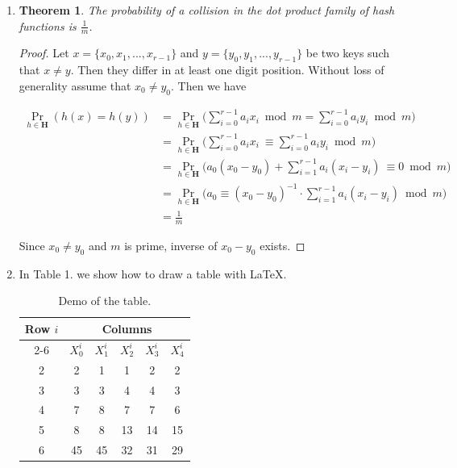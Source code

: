 \documentclass{article}
\newtheorem{theorem}{Theorem}
\begin{document}
\begin{enumerate}
\item
\begin{theorem}
    The probability of a collision in the dot product family of hash functions is $\frac{1}{m}$.
\end{theorem}

\begin{proof}
    Let $x = \{x_{0},x_{1},...,x_{r-1}\}$ and $y = \{y_{0},y_{1},...,y_{r-1}\}$ be two keys such that $x \not = y$. Then they differ in at least one digit position. Without loss of generality assume that $x_0 \not = y_0$. Then we have

    \begin{align*}
        \underset{h\in\mathbf{H}}{\Pr}(h(x)=h(y)) &= \underset{h\in\mathbf{H}}{\Pr}\bigl(\sum\limits_{i=0}^{r-1} a_{i}x_{i}\bmod  m=\sum\limits_{i=0}^{r-1} a_{i}y_{i} \bmod m\bigr)\\
        &= \underset{h\in\mathbf{H}}{\Pr}\bigl(\sum\limits_{i=0}^{r-1} a_{i}x_{i}\ \equiv \sum\limits_{i=0}^{r-1} a_{i}y_{i} \bmod m\bigr)\\
        &= \underset{h\in\mathbf{H}}{\Pr}\bigl(a_0(x_0-y_0) + \sum\limits_{i=1}^{r-1} a_{i}(x_{i}-y_i)\ \equiv 0 \bmod m\bigr)\\
        &= \underset{h\in\mathbf{H}}{\Pr}\bigl(a_0 \equiv (x_0-y_0)^{-1} \cdot \sum\limits_{i=1}^{r-1} a_{i}(x_{i}-y_i)\bmod{m}\bigr)\\
        &= \frac{1}{m}
    \end{align*}

    Since $x_0 \not = y_0$ and $m$ is prime, inverse of $x_0-y_0$ exists.
\end{proof}

\item

In Table 1. we show how to draw a table with \LaTeX.

\begin{table}[h]
\centering
\renewcommand{\arraystretch}{1.2}
\begin{tabular}{c|ccccc}
\hline
\multicolumn{1}{c|}{Row $i$} & \multicolumn{5}{c}{Columns}\\
\cline{2-6}
\multicolumn{1}{c|}{} & $X^i_0$& $X^i_1$& $X^i_2$& $X^i_3$& $X^i_4$\\
\hline
2&2&1&1&2&2\\
3&3&3&4&4&3\\
4&7&8&7&7&6\\
5&8&8&13&14&15\\
6&45&45&32&31&29\\
\hline
\end{tabular}
\caption{Demo of the table.}
\end{table}
\end{enumerate}
\end{document}
